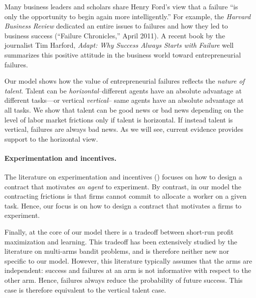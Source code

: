 \documentclass[12pt,american]{paper}
\theoremstyle{remark}
\begin{document}
Many business leaders and scholars share Henry Ford's view that a failure ``is only the opportunity to begin again more intelligently.'' For example, the \emph{Harvard Business Review} dedicated an entire issues to failures and how they led to business success (``Failure Chronicles,'' April 2011). A recent book by the journalist Tim Harford, \emph{Adapt: Why Success Always Starts with Failure} well summarizes this positive attitude in the business world toward entrepreneurial failures.

Our model shows how the value of entrepreneurial failures reflects the \textit{nature of talent}. Talent can be \emph{horizontal}--different agents have an absolute advantage at different tasks---or vertical \emph{vertical}-- same agents have an absolute advantage at all tasks. We show that talent can be good news or bad news depending on the level of labor market frictions only if talent is horizontal. If instead talent is vertical, failures are always bad news. As we will see, current evidence provides support to the horizontal view. 



\paragraph{Experimentation and incentives.} 

The literature on experimentation and incentives (\citealp*{jeitschko_information_2002, manso2011motivating,macchiavello,Gottlieb2013}) focuses on how to design a contract that motivates \textit{an agent} to experiment. By contrast, in our model the contracting frictions is that firms cannot commit to allocate a worker on a given task. Hence, our focus is on how to design a contract that motivates a firms to experiment. 

 

Finally, at the core of our model there is a tradeoff between short-run profit maximization and learning. This tradeoff has been extensively studied by the literature on multi-arms bandit problems, and is therefore neither new nor  specific to our model.  However, this literature typically assumes that the arms are independent: success and failures at an arm is not informative with respect to the other arm. Hence, failures always reduce the probability of future success. This case is therefore equivalent to the vertical talent case. %
\end{document}
